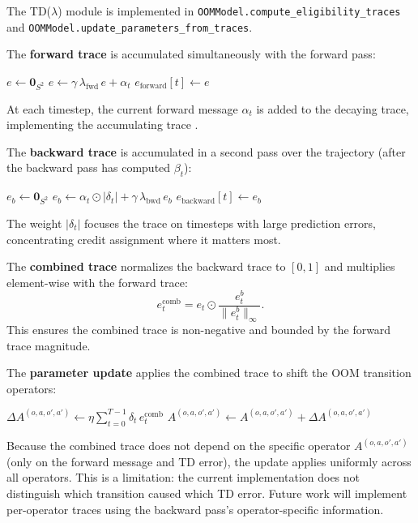 
The TD($\lambda$) module is implemented in
\verb|OOMModel.compute_eligibility_traces| and
\verb|OOMModel.update_parameters_from_traces|.


The \textbf{forward trace} is accumulated simultaneously with the forward
pass:
\begin{algorithmic}
\State $e \leftarrow \mathbf{0}_{S^2}$
  \State $e \leftarrow \gamma\,\lambda_{\mathrm{fwd}}\,e + \alpha_t$
  \State $e_{\mathrm{forward}}[t] \leftarrow e$
\EndFor
\end{algorithmic}
At each timestep, the current forward message $\alpha_t$ is added to the
decaying trace, implementing the accumulating trace
\citep{sutton2000review}.


The \textbf{backward trace} is accumulated in a second pass over the
trajectory (after the backward pass has computed $\beta_t$):
\begin{algorithmic}
\State $e_b \leftarrow \mathbf{0}_{S^2}$
  \State $e_b \leftarrow \alpha_t \odot |\delta_t| + \gamma\,\lambda_{\mathrm{bwd}}\,e_b$
  \State $e_{\mathrm{backward}}[t] \leftarrow e_b$
\EndFor
\end{algorithmic}
The weight $|\delta_t|$ focuses the trace on timesteps with large
prediction errors, concentrating credit assignment where it matters most.


The \textbf{combined trace} normalizes the backward trace to $[0,1]$
and multiplies element-wise with the forward trace:
\begin{equation}
e^{\mathrm{comb}}_t = e_t \odot \frac{e^b_t}{\|e^b_t\|_\infty}.
\end{equation}
This ensures the combined trace is non-negative and bounded by the
forward trace magnitude.


The \textbf{parameter update} applies the combined trace to shift the
OOM transition operators:
\begin{algorithmic}
  \State $\Delta A^{(o,a,o',a')} \leftarrow \eta \sum_{t=0}^{T-1} \delta_t\, e^{\mathrm{comb}}_t$
  \State $A^{(o,a,o',a')} \leftarrow A^{(o,a,o',a')} + \Delta A^{(o,a,o',a')}$
\EndFor
\end{algorithmic}
Because the combined trace does not depend on the specific operator
$A^{(o,a,o',a')}$ (only on the forward message and TD error), the
update applies uniformly across all operators. This is a limitation:
the current implementation does not distinguish which transition caused
which TD error. Future work will implement per-operator traces using
the backward pass's operator-specific information.

